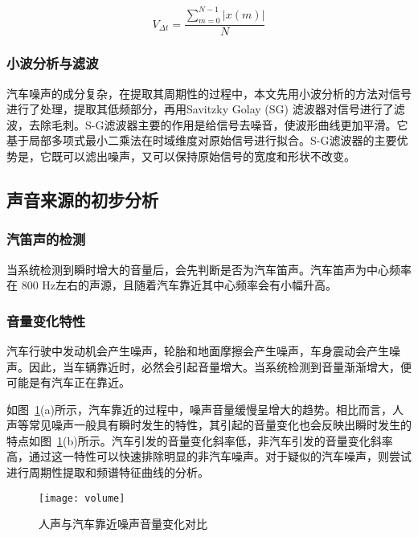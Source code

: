 \begin{equation}
\label{equ:chap3:volume}
V_{\Delta t}= \frac{\sum_{m=0}^{N-1}\left | x\left ( m \right ) \right |}{N}
\end{equation}

\subsubsection{小波分析与滤波}

汽车噪声的成分复杂，在提取其周期性的过程中，本文先用小波分析的方法对信号进行了处理，提取其低频部分，再用Savitzky Golay (SG) 滤波器对信号进行了滤波，去除毛刺。S-G滤波器主要的作用是给信号去噪音，使波形曲线更加平滑。它基于局部多项式最小二乘法在时域维度对原始信号进行拟合。S-G滤波器的主要优势是，它既可以滤出噪声，又可以保持原始信号的宽度和形状不改变。

\subsection{声音来源的初步分析}
\subsubsection{汽笛声的检测}

当系统检测到瞬时增大的音量后，会先判断是否为汽车笛声。汽车笛声为中心频率在 800 Hz左右的声源，且随着汽车靠近其中心频率会有小幅升高。

\subsubsection{音量变化特性}

汽车行驶中发动机会产生噪声，轮胎和地面摩擦会产生噪声，车身震动会产生噪声。因此，当车辆靠近时，必然会引起音量增大。当系统检测到音量渐渐增大，便可能是有汽车正在靠近。

如图~\ref{fig:volume}(a)所示，汽车靠近的过程中，噪声音量缓慢呈增大的趋势。相比而言，人声等常见噪声一般具有瞬时发生的特性，其引起的音量变化也会反映出瞬时发生的特点如图~\ref{fig:volume}(b)所示。汽车引发的音量变化斜率低，非汽车引发的音量变化斜率高，通过这一特性可以快速排除明显的非汽车噪声。对于疑似的汽车噪声，则尝试进行周期性提取和频谱特征曲线的分析。

\begin{figure}[htbp] %
  \centering
  \texttt{[image: volume]}
  \caption[音量变化特性对比]{人声与汽车靠近噪声音量变化对比}
  \label{fig:volume}
\end{figure}

